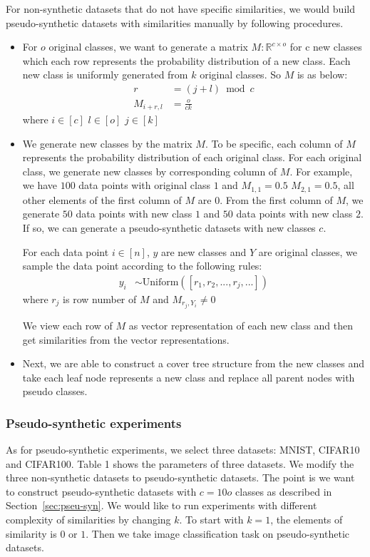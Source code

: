 \documentclass[10pt]{article}
\theoremstyle{definition}
\newcommand{\R}{\mathbb R}
\begin{document}
For non-synthetic datasets that do not have specific similarities, we would build pseudo-synthetic datasets with similarities manually by following procedures. 
\begin{itemize}
  \item
  For $o$ original classes, we want to generate a matrix $M : \R^{c\times o}$ for c new classes which each row represents the probability distribution of a new class. 
  Each new class is uniformly generated from $k$ original classes.
  So $M$ is as below:
\begin{align}
    r &= (j+l) \bmod c \\
    M_{i+r,l} &= \frac{o}{ck}  
\end{align}
where $i \in [c]$ $l \in [o]$ $j \in [k]$ 
  
  \item
  We generate new classes by the matrix $M$.
  To be specific, each column of $M$ represents the probability distribution of each original class.
  For each original class, we generate new classes by corresponding column of $M$.
  For example, we have $100$ data points with original class $1$ and $M_{1,1}=0.5$ $M_{2,1}=0.5$, all other elements of the first column of $M$ are $0$.
  From the first column of $M$, we generate $50$ data points with new class $1$ and $50$ data points with new class $2$.
  If so, we can generate a pseudo-synthetic datasets with new classes $c$.
  
  For each data point $i\in[n]$, 
  $y$ are new classes and $Y$ are original classes,
  we sample the data point according to the following rules:
\begin{align}
    y_i &\sim \text{Uniform}([r_1, r_2,...,r_j,...])
\end{align}
where $r_j$ is row number of $M$ and $M_{r_j,Y_i} \ne 0$
  
  We view each row of $M$ as vector representation of each new class and then get similarities from the vector representations.

  \item
  Next, we are able to construct a cover tree structure from the new classes and take each leaf node represents a new class and replace all parent nodes with pseudo classes. 
\end{itemize}

\subsubsection{Pseudo-synthetic experiments}
As for pseudo-synthetic experiments, we select three datasets: MNIST, CIFAR10 and CIFAR100. 
Table 1 shows the parameters of three datasets. We modify the three non-synthetic datasets to pseudo-synthetic datasets. 
The point is we want to construct pseudo-synthetic datasets with $c=10o$ classes as described in Section~\ref{sec:pseu-syn}.
We would like to run experiments with different complexity of similarities by changing $k$.
To start with $k=1$, the elements of similarity is $0$ or $1$.
Then we take image classification task on pseudo-synthetic datasets.
\end{document}
